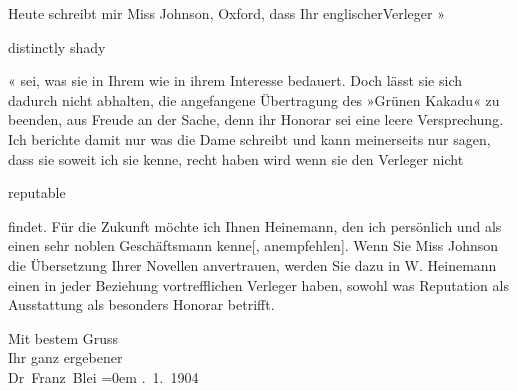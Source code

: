 \pstart
           Heute schreibt mir Miss Johnson, Oxford, dass Ihr englischerVerleger »\begin{otherlanguage}{english}distinctly shady\end{otherlanguage}« sei, was sie in Ihrem wie in ihrem
               Interesse bedauert. Doch lässt sie sich dadurch nicht abhalten, die angefangene
               Übertragung des »Grünen Kakadu« {\pb}zu beenden, aus Freude an der Sache, denn
               ihr Honorar sei eine leere Versprechung. Ich berichte damit nur was die Dame schreibt und kann
               meinerseits nur sagen, dass sie soweit ich sie kenne, recht haben wird wenn sie den
                  Verleger nicht \begin{otherlanguage}{english}reputable\end{otherlanguage} findet. Für die Zukunft möchte ich Ihnen Heinemann, den ich persönlich und als einen sehr
               noblen Geschäftsmann {\pb}kenne{[},
                  anempfehlen{]}. Wenn Sie Miss Johnson die Übersetzung Ihrer Novellen anvertrauen, werden Sie dazu in W. Heinemann einen in jeder Beziehung
               vortrefflichen Verleger haben, sowohl was Reputation als Ausstattung als besonders
               Honorar betrifft.\pend
           
\pstart
           Mit bestem Gruss{\\[\baselineskip]}Ihr ganz ergebener{\\[\baselineskip]}\spacefill\mbox{Dr Franz Blei}\pend
           \leftskip=0em{}
. 1. 1904\pend
           \endnumbering{}  
      